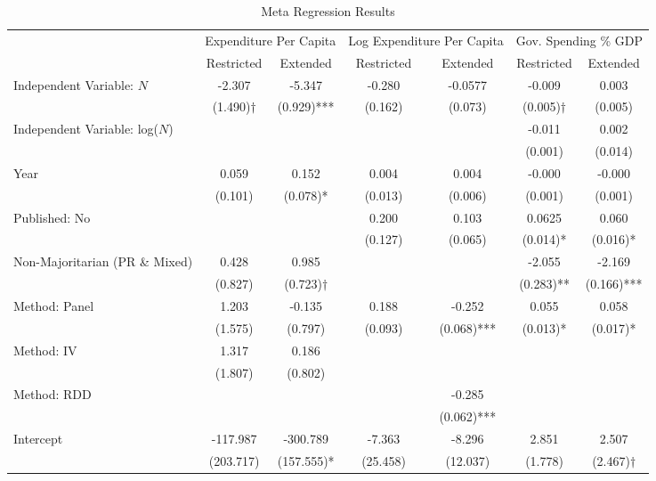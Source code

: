 \documentclass[a4paper,12pt]{article}
\begin{document}
\begin{table}[htpb]
\footnotesize
\caption{Meta Regression Results}
\label{tab:regressions}
\centering
\begin{tabular}{lcccccc}
\toprule
\midrule
\multicolumn{1}{c}{ } & \multicolumn{2}{c}{Expenditure Per Capita} & \multicolumn{2}{c}{Log Expenditure Per Capita} & \multicolumn{2}{c}{Gov. Spending \% GDP} \\
\cmidrule(l{3pt}r{3pt}){2-3} \cmidrule(l{3pt}r{3pt}){4-5} \cmidrule(l{3pt}r{3pt}){6-7}
& Restricted & Extended & Restricted & Extended & Restricted & Extended \\
\midrule
Independent Variable: $N$ & -2.307 & -5.347 &  -0.280 &  -0.0577 &-0.009 & 0.003\\
                          & (1.490)$\dagger$ & (0.929)*** & (0.162) & (0.073) & (0.005)$\dagger$ & (0.005)\\
%
Independent Variable: log($N$) &  &  &  &  &-0.011& 0.002\\
                               &  &  &  &  & (0.001) & (0.014)\\
%
Year & 0.059 & 0.152 &  0.004 &  0.004 &-0.000& -0.000\\
     & (0.101) & (0.078)* & (0.013) & (0.006) & (0.001) & (0.001)\\
%
Published: No &  &  & 0.200 &  0.103 & 0.0625 & 0.060\\
              &  &  & (0.127) & (0.065) & (0.014)* & (0.016)*\\
%
Non-Majoritarian (PR \& Mixed) & 0.428 & 0.985 & &  & -2.055 & -2.169\\
                               & (0.827) & (0.723)$\dagger$ & &  & (0.283)** & (0.166)***\\
%
Method: Panel & 1.203 & -0.135 & 0.188 & -0.252 & 0.055 & 0.058\\
              & (1.575) & (0.797) & (0.093) & (0.068)*** & (0.013)* & (0.017)*\\
%
Method: IV & 1.317 & 0.186 &  &  &  & \\
           & (1.807) & (0.802) &  &  &  & \\
%
Method: RDD &  &  &  &-0.285&  & \\
            &  &  &  & (0.062)*** &  & \\
% 
Intercept & -117.987 & -300.789 & -7.363 & -8.296 & 2.851 & 2.507\\
          & (203.717) & (157.555)* & (25.458) & (12.037) & (1.778) & (2.467)$\dagger$\\
\bottomrule
\end{tabular}
\begin{minipage}{\textwidth}
\renewcommand{\footnoterule}{}
\end{minipage}
\end{table}
\end{document}
